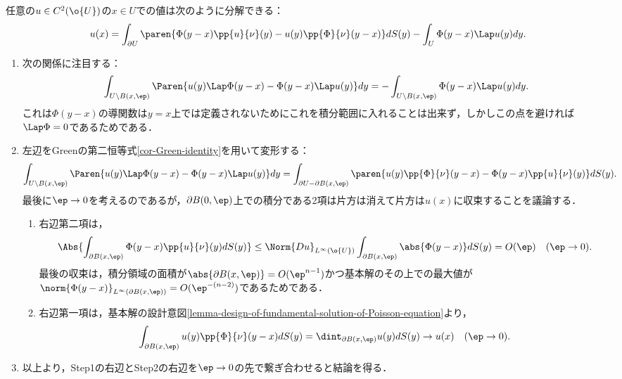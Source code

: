 \documentclass[uplatex,dvipdfmx]{jsreport}
\begin{document}
\begin{lemma}
    任意の$u\in C^2(\o{U})$の$x\in U$での値は次のように分解できる：
    \[u(x)=\int_{\partial U}\paren{\Phi(y-x)\pp{u}{\nu}(y)-u(y)\pp{\Phi}{\nu}(y-x)}dS(y)-\int_U\Phi(y-x)\Lap u(y)dy.\]
\end{lemma}
\begin{Proof}\mbox{}
    \begin{enumerate}[{Step}1]
        \item 次の関係に注目する：
        \[\int_{U\setminus B(x,\ep)}\Paren{u(y)\Lap\Phi(y-x)-\Phi(y-x)\Lap u(y)}dy=-\int_{U\setminus B(x,\ep)}\Phi(y-x)\Lap u(y)dy.\]
        これは$\Phi(y-x)$の導関数は$y=x$上では定義されないためにこれを積分範囲に入れることは出来ず，しかしこの点を避ければ$\Lap\Phi=0$であるためである．
        \item 左辺をGreenの第二恒等式\ref{cor-Green-identity}を用いて変形する：
        \begin{align*}
            \int_{U\setminus B(x,\ep)}\Paren{u(y)\Lap\Phi(y-x)-\Phi(y-x)\Lap u(y)}dy&=\int_{\partial U-\partial B(x,\ep)}\paren{u(y)\pp{\Phi}{\nu}(y-x)-\Phi(y-x)\pp{u}{\nu}(y)}dS(y).
        \end{align*}
        最後に$\ep\to0$を考えるのであるが，$\partial B(0,\ep)$上での積分である2項は片方は消えて片方は$u(x)$に収束することを議論する．
        \begin{enumerate}
            \item 右辺第二項は，
            \[\Abs{\int_{\partial B(x,\ep)}\Phi(y-x)\pp{u}{\nu}(y)dS(y)}\le\Norm{Du}_{L^\infty(\o{U})}\int_{\partial B(x,\ep)}\abs{\Phi(y-x)}dS(y)=O(\ep)\quad(\ep\to0).\]
            最後の収束は，積分領域の面積が$\abs{\partial B(x,\ep)}=O(\ep^{n-1})$かつ基本解のその上での最大値が$\norm{\Phi(y-x)}_{L^\infty(\partial B(x,\ep))}=O(\ep^{-(n-2)})$であるためである．
            \item 右辺第一項は，基本解の設計意図\ref{lemma-design-of-fundamental-solution-of-Poisson-equation}より，
            \[\int_{\partial B(x,\ep)}u(y)\pp{\Phi}{\nu}(y-x)dS(y)=\dint_{\partial B(x,\ep)}u(y)dS(y)\to u(x)\quad(\ep\to0).\]
        \end{enumerate}
        \item 以上より，Step1の右辺とStep2の右辺を$\ep\to0$の先で繋ぎ合わせると結論を得る．
    \end{enumerate}
\end{Proof}
\end{document}
